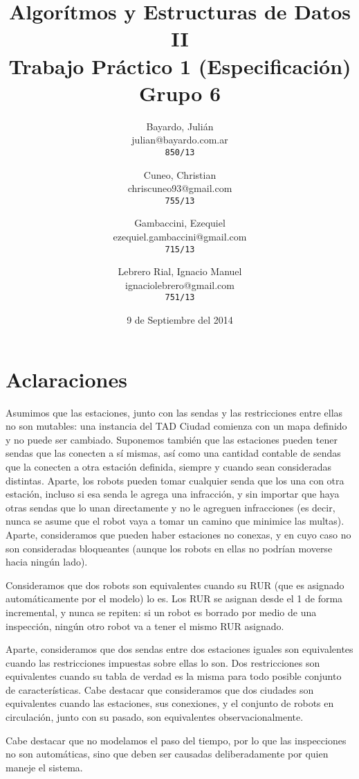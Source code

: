 \documentclass[a4paper,titlepage]{article}
\begin{document}
\title{Algorítmos y Estructuras de Datos II\\
Trabajo Práctico 1 (Especificación)\\
Grupo 6}

\author{
	Bayardo, Julián\\
	julian@bayardo.com.ar\\
	\texttt{850/13}
	\and
	Cuneo, Christian\\
	chriscuneo93@gmail.com\\
	\texttt{755/13}
	\and
	Gambaccini, Ezequiel\\
	ezequiel.gambaccini@gmail.com\\
	\texttt{715/13}
	\and
	Lebrero Rial, Ignacio Manuel\\
	ignaciolebrero@gmail.com\\
	\texttt{751/13}
}

\date{9 de Septiembre del 2014}

\maketitle

\section{Aclaraciones}

Asumimos que las estaciones, junto con las sendas y las restricciones entre ellas no son mutables: una instancia del TAD Ciudad comienza con un mapa definido y no puede ser cambiado. Suponemos también que las estaciones pueden tener sendas que las conecten a sí mismas, así como una cantidad contable de sendas que la conecten a otra estación definida, siempre y cuando sean consideradas distintas. Aparte, los robots pueden tomar cualquier senda que los una con otra estación, incluso si esa senda le agrega una infracción, y sin importar que haya otras sendas que lo unan directamente y no le agreguen infracciones (es decir, nunca se asume que el robot vaya a tomar un camino que minimice las multas). Aparte, consideramos que pueden haber estaciones no conexas, y en cuyo caso no son consideradas bloqueantes (aunque los robots en ellas no podrían moverse hacia ningún lado).

Consideramos que dos robots son equivalentes cuando su RUR (que es asignado automáticamente por el modelo) lo es. Los RUR se asignan desde el 1 de forma incremental, y nunca se repiten: si un robot es borrado por medio de una inspección, ningún otro robot va a tener el mismo RUR asignado.

Aparte, consideramos que dos sendas entre dos estaciones iguales son equivalentes cuando las restricciones impuestas sobre ellas lo son. Dos restricciones son equivalentes cuando su tabla de verdad es la misma para todo posible conjunto de características. Cabe destacar que consideramos que dos ciudades son equivalentes cuando las estaciones, sus conexiones, y el conjunto de robots en circulación, junto con su pasado, son equivalentes observacionalmente.

Cabe destacar que no modelamos el paso del tiempo, por lo que las inspecciones no son automáticas, sino que deben ser causadas deliberadamente por quien maneje el sistema.
\end{document}
